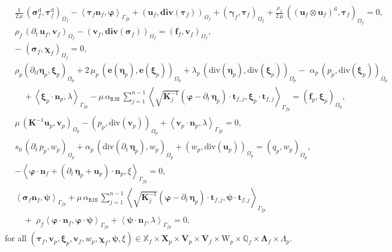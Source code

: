 \documentclass[11pt]{article}
\numberwithin{equation}{section}
\newcommand{\ds}{\displaystyle}
\newcommand{\bgamma}{{\boldsymbol\gamma}}
\newcommand{\bLambda}{{\boldsymbol\Lambda}}
\newcommand{\bbeta}{{\boldsymbol\eta}}
\newcommand{\bsi}{{\boldsymbol\sigma}}
\newcommand{\bvarphi}{{\boldsymbol\varphi}}
\newcommand{\bpsi}{{\boldsymbol\psi}}
\newcommand{\btau}{{\boldsymbol\tau}}
\newcommand{\bchi}{{\boldsymbol\chi}}
\newcommand{\bxi}{{\boldsymbol\xi}}
\newcommand{\bv}{{\mathbf{v}}}
\newcommand{\f}{\mathbf{f}}
\newcommand{\bu}{\mathbf{u}}
\newcommand{\bt}{{\mathbf{t}}}
\newcommand{\bn}{{\mathbf{n}}}
\newcommand{\be}{{\mathbf{e}}}
\newcommand{\0}{{\mathbf{0}}}
\def\bK{\mathbf{K}}
\def\bX{\mathbf{X}}
\def\bV{\mathbf{V}}
\newcommand\bbQ{\mathbb{Q}}
\newcommand\bbX{\mathbb{X}}
\def\W{\mathrm{W}}
\def\rd{\mathrm{d}}
\def\BJS{\mathtt{BJS}}
\def\bdiv{\mathbf{div}}
\def\div{\mathrm{div}}
\def\pil{\left<}
\def\pir{\right>}
\numberwithin{equation}{section}
\begin{document}
\begin{subequations}\label{eq:continuous-weak-formulation-1}
\begin{align}
& \ds \frac{1}{2\,\mu}\,(\bsi^\rd_f,\btau^\rd_f)_{\Omega_f} - \pil\btau_f\bn_f,\bvarphi \pir_{\Gamma_{fp}} + (\bu_f,\bdiv(\btau_f))_{\Omega_f} + (\bgamma_f,\btau_f)_{\Omega_f} 
+ \frac{\rho_f}{2\,\mu}\,((\bu_f\otimes\bu_f)^\rd,\btau_f)_{\Omega_f} = 0, \label{eq:continuous-weak-formulation-1a}\\[1ex]
& \ds \rho_f\, (\partial_t\,\bu_f,\bv_f)_{\Omega_f} - (\bv_f,\bdiv(\bsi_f))_{\Omega_f} = (\f_f,\bv_f)_{\Omega_f}, \label{eq:continuous-weak-formulation-1b} \\[1ex]
& \ds -\,\,(\bsi_f,\bchi_f)_{\Omega_f} = 0, \label{eq:continuous-weak-formulation-1c} \\[1ex]
& \ds \rho_p (\partial_{tt}\bbeta_p,\bxi_p)_{\Omega_p} + 2\,\mu_p\,(\be(\bbeta_p),\be(\bxi_p))_{\Omega_p} + \lambda_p\,(\div(\bbeta_p),\div(\bxi_p))_{\Omega_p} -\,\,\alpha_p\,(p_p,\div(\bxi_p))_{\Omega_p} \nonumber \\[0.5ex] 
& \ds\quad +\pil\bxi_p\cdot\bn_p,\lambda\pir_{\Gamma_{fp}} - \mu\,\alpha_{\BJS}\,\sum_{j=1}^{n-1} \pil\sqrt{\bK^{-1}_j}\left( \bvarphi - \partial_t\,\bbeta_p \right)\cdot\bt_{f,j},\bxi_p\cdot\bt_{f,j} \pir_{\Gamma_{fp}} = (\f_p,\bxi_p)_{\Omega_p}, \label{eq:continuous-weak-formulation-1d} \\[1ex]
& \ds \mu\,(\bK^{-1}\bu_p,\bv_p)_{\Omega_p} - (p_p,\div(\bv_p))_{\Omega_p} + \pil\bv_p\cdot\bn_p,\lambda\pir_{\Gamma_{fp}} = 0, \label{eq:continuous-weak-formulation-1e} \\[1ex]
& \ds s_0\,(\partial_t\, p_p,w_p)_{\Omega_p} + \alpha_p\,(\div(\partial_t\,\bbeta_p), w_p)_{\Omega_p} + (w_p,\div(\bu_p))_{\Omega_p} = (q_p,w_p)_{\Omega_p},\label{eq:continuous-weak-formulation-1f} \\[1ex]
& \ds - \pil\bvarphi\cdot\bn_f + \left(\partial_t\,\bbeta_p + \bu_p\right)\cdot\bn_p,\xi\pir_{\Gamma_{fp}} = 0, \label{eq:continuous-weak-formulation-1g} \\[1ex]
& \ds \pil\bsi_f\bn_f,\bpsi\pir_{\Gamma_{fp}} + \mu\,\alpha_{\BJS}\,\sum_{j=1}^{n-1} \pil\sqrt{\bK^{-1}_j}\left( \bvarphi - \partial_t\,\bbeta_p \right)\cdot\bt_{f,j},\bpsi\cdot\bt_{f,j} \pir_{\Gamma_{fp}} \nonumber \\[0.5ex]
 & \ds\quad +\,\, \rho_f\pil \bvarphi\cdot\bn_f, \bvarphi\cdot\bpsi \pir_{\Gamma_{fp}} + \pil\bpsi\cdot\bn_f,\lambda\pir_{\Gamma_{fp}} = 0,\label{eq:continuous-weak-formulation-1h}
\end{align}
\end{subequations}
for all $(\btau_f, \bv_p, \bxi_p, \bv_f, w_p, \bchi_f, \bpsi, \xi)\in \bbX_f\times \bX_p\times \bV_p\times \bV_f\times \W_p\times \bbQ_f\times \bLambda_f\times \Lambda_p$.
\end{document}
